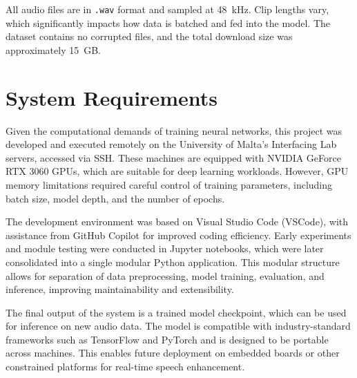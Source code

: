 All audio files are in \texttt{.wav} format and sampled at 48~kHz. Clip lengths vary, which significantly impacts how data is batched and fed into the model. The dataset contains no corrupted files, and the total download size was approximately 15~GB.

\section{System Requirements}
\label{sec:system_requirements}

Given the computational demands of training neural networks, this project was developed and executed remotely on the University of Malta’s Interfacing Lab servers, accessed via SSH. These machines are equipped with NVIDIA GeForce RTX 3060 GPUs, which are suitable for deep learning workloads. However, GPU memory limitations required careful control of training parameters, including batch size, model depth, and the number of epochs.

The development environment was based on Visual Studio Code (VSCode), with assistance from GitHub Copilot for improved coding efficiency. Early experiments and module testing were conducted in Jupyter notebooks, which were later consolidated into a single modular Python application. This modular structure allows for separation of data preprocessing, model training, evaluation, and inference, improving maintainability and extensibility.

The final output of the system is a trained model checkpoint, which can be used for inference on new audio data. The model is compatible with industry-standard frameworks such as TensorFlow and PyTorch and is designed to be portable across machines. This enables future deployment on embedded boards or other constrained platforms for real-time speech enhancement.

